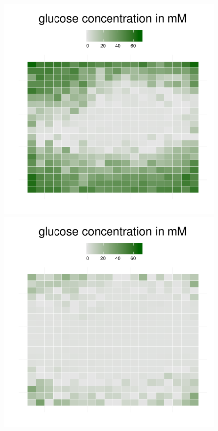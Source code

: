 \begin{figure}[h!]
{\begin{minipage}[t]{0.3\textwidth}
  \end{minipage}
  \begin{minipage}[t]{0.3\textwidth}
    \includegraphics[width=\textwidth]{../results/img/beijerinckii_20x20_seed943_glc40.pdf}
  \end{minipage}
  \begin{minipage}[t]{0.3\textwidth}
    \includegraphics[width=\textwidth]{../results/img/beijerinckii_20x20_seed943_glc50.pdf}

\end{minipage}}
\end{figure}
